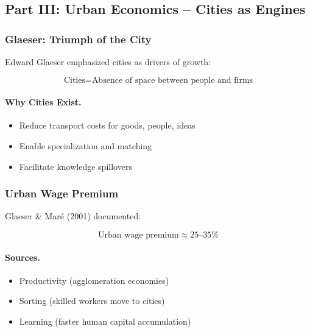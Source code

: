 \subsection{Part III: Urban Economics – Cities as Engines}

\subsubsection{Glaeser: Triumph of the City}

Edward Glaeser emphasized cities as drivers of growth:

\begin{equation}
\boxed{
\text{Cities} = \text{Absence of space between people and firms}
}
\label{eq:glaeser-city}
\end{equation}

\paragraph{Why Cities Exist.}
\begin{itemize}
    \item Reduce transport costs for goods, people, ideas
    \item Enable specialization and matching
    \item Facilitate knowledge spillovers
\end{itemize}

\subsubsection{Urban Wage Premium}

Glaeser \& Maré (2001) documented:

\begin{equation}
\boxed{
\text{Urban wage premium} \approx 25\text{--}35\%
}
\label{eq:urban-premium}
\end{equation}

\paragraph{Sources.}
\begin{itemize}
    \item Productivity (agglomeration economies)
    \item Sorting (skilled workers move to cities)
    \item Learning (faster human capital accumulation)
\end{itemize}

